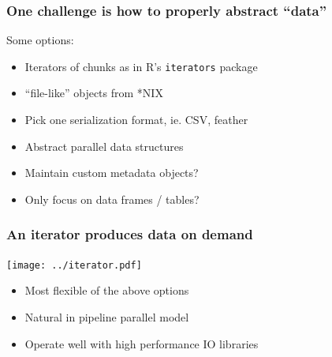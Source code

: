 \documentclass{beamer}
\begin{document}
\begin{frame}[fragile]

    \frametitle{One challenge is how to properly abstract ``data''}

    Some options:

    \begin{itemize}
        \item Iterators of chunks as in R's \texttt{iterators} package
        \item ``file-like'' objects from *NIX
        \item Pick one serialization format, ie. CSV, feather
        \item Abstract parallel data structures
    \end{itemize}

    \pause

    \begin{itemize}
        \item Maintain custom metadata objects?
        \item Only focus on data frames / tables?
    \end{itemize}

\end{frame}
\begin{frame}

    \frametitle{An iterator produces data on demand}

    \centerline{\texttt{[image: ../iterator.pdf]}}

    \begin{itemize}
        \item Most flexible of the above options
        \item Natural in pipeline parallel model
        \item Operate well with high performance IO libraries
    \end{itemize}




%
%
%
%
%
%    
%

\end{frame}
\end{document}
